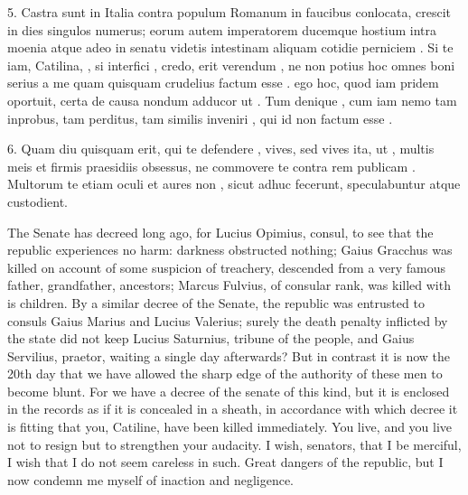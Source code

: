 {  5. Castra sunt in Italia contra populum Romanum in  faucibus conlocata, crescit in dies singulos  numerus; eorum autem  imperatorem ducemque hostium intra moenia atque adeo in senatu videtis intestinam aliquam cotidie perniciem  . Si te iam, Catilina, , si interfici , credo, erit verendum , ne non potius hoc omnes boni serius a me quam quisquam crudelius factum esse .  ego hoc, quod iam pridem  oportuit, certa de causa nondum adducor ut . Tum denique , cum iam nemo tam inprobus, tam perditus, tam  similis inveniri , qui id non  factum esse .

  6. Quam diu quisquam erit, qui te defendere , vives, sed vives ita, ut , multis meis et firmis praesidiis obsessus, ne commovere te contra rem publicam . Multorum te etiam oculi et aures non , sicut adhuc fecerunt, speculabuntur atque custodient.
}{
  The Senate has decreed long ago, for Lucius Opimius, consul, to see that the republic experiences no harm: darkness obstructed nothing; Gaius Gracchus was killed on account of some suspicion of treachery, descended from a very famous father, grandfather, ancestors; Marcus Fulvius, of consular rank, was killed with is children. By a similar decree of the Senate, the republic was entrusted to consuls Gaius Marius and Lucius Valerius; surely the death penalty inflicted by the state did not keep Lucius Saturnius, tribune of the people, and Gaius Servilius, praetor, waiting a single day afterwards? But in contrast it is now the 20th day that we have allowed the sharp edge of the authority of these men to become blunt. For we have a decree of the senate of this kind, but it is enclosed in the records as if it is concealed in a sheath, in accordance with which decree it is fitting that you, Catiline, have been killed immediately. You live, and you live not to resign but to strengthen your audacity. I wish, senators, that I be merciful, I wish that I do not seem careless in such. Great dangers of the republic, but I now condemn me myself of inaction and negligence.

}
